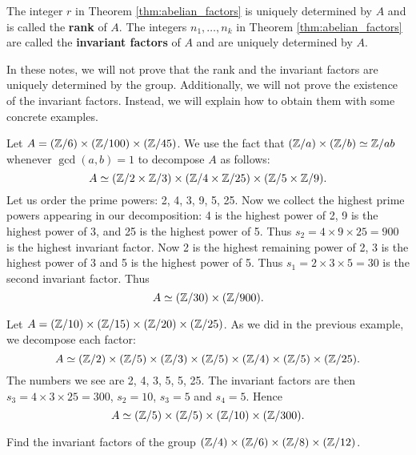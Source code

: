 The integer $r$ 
in Theorem \ref{thm:abelian_factors}
is uniquely determined by $A$ and 
is called the \textbf{rank} of $A$. The integers $n_1,\dots,n_k$ 
in Theorem \ref{thm:abelian_factors}
are called the \textbf{invariant factors} of $A$ and 
are uniquely determined by $A$. 

In these notes, we will not prove that the rank and the invariant factors are uniquely determined by the group. Additionally, we will not prove the existence 
of the invariant factors. Instead, we will explain how to obtain them with some concrete examples.

\begin{example}
    Let $A=(\mathbb{Z}/6)\times(\mathbb{Z}/100)\times(\mathbb{Z}/45)$. We use 
    the fact that $(\mathbb{Z}/a)\times(\mathbb{Z}/b)\simeq\mathbb{Z}/ab$ whenever $\gcd(a,b)=1$
    to decompose $A$ as follows:
    \[
    A\simeq (\mathbb{Z}/2\times\mathbb{Z}/3)\times(\mathbb{Z}/4\times\mathbb{Z}/25)\times(\mathbb{Z}/5\times\mathbb{Z}/9).
    \]
    Let us order the prime powers: 2, 4, 3, 9, 5, 25. 
    Now we collect the highest prime powers appearing in our decomposition: 4 is the highest power of 2,
    9 is the highest power of 3, and 25 is the highest power of 5. Thus 
    $s_2=4\times 9\times 25=900$ is the highest invariant factor. Now 
    2 is the highest remaining power of 2, 
    3 is the highest power of 3 and 5 is the highest power of 5. Thus 
    $s_1=2\times 3\times 5=30$ is the second invariant factor. 
    Thus 
    \[ 
    A\simeq (\mathbb{Z}/30)\times(\mathbb{Z}/900).
    \]
\end{example}

\begin{example}
    Let $A=(\mathbb{Z}/10)\times(\mathbb{Z}/15)\times(\mathbb{Z}/20)\times(\mathbb{Z}/25)$. 
    As we did in the previous example, we decompose each factor: 
    \[ 
    A\simeq (\mathbb{Z}/2)\times(\mathbb{Z}/5)\times(\mathbb{Z}/3)\times (\mathbb{Z}/5)\times(\mathbb{Z}/4)\times (\mathbb{Z}/5)\times(\mathbb{Z}/25). 
    \]
    The numbers we see are 2, 4, 3, 5, 5, 25. The invariant factors are
    then $s_3=4\times 3\times 25=300$, $s_2=10$, $s_3=5$ and $s_4=5$. 
    Hence 
    \[ 
    A\simeq (\mathbb{Z}/5)\times(\mathbb{Z}/5)\times(\mathbb{Z}/10)\times(\mathbb{Z}/300).
    \]
\end{example}

\begin{exercise}
\label{xca:factors:24,12,4,2}
    Find the invariant factors 
    of the group $(\mathbb{Z}/4)\times(\mathbb{Z}/6)\times(\mathbb{Z}/8)\times(\mathbb{Z}/12)$. 
\end{exercise}




    


